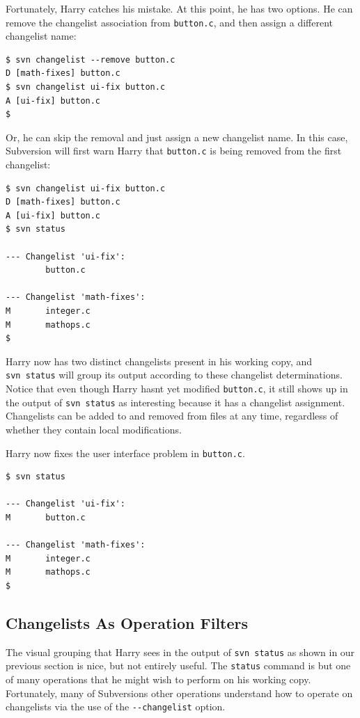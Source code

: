 Fortunately, Harry catches his mistake. At this point, he has two
options. He can remove the changelist association from
\texttt{button.c}, and then assign a different changelist name:

\begin{verbatim}
$ svn changelist --remove button.c
D [math-fixes] button.c
$ svn changelist ui-fix button.c
A [ui-fix] button.c
$
\end{verbatim}

Or, he can skip the removal and just assign a new changelist name. In
this case, Subversion will first warn Harry that \texttt{button.c} is
being removed from the first changelist:

\begin{verbatim}
$ svn changelist ui-fix button.c
D [math-fixes] button.c
A [ui-fix] button.c
$ svn status

--- Changelist 'ui-fix':
        button.c

--- Changelist 'math-fixes':
M       integer.c
M       mathops.c
$
\end{verbatim}

Harry now has two distinct changelists present in his working copy, and
\texttt{svn\ status} will group its output according to these changelist
determinations. Notice that even though Harry hasn\textquotesingle t yet
modified \texttt{button.c}, it still shows up in the output of
\texttt{svn\ status} as interesting because it has a changelist
assignment. Changelists can be added to and removed from files at any
time, regardless of whether they contain local modifications.

Harry now fixes the user interface problem in \texttt{button.c}.

\begin{verbatim}
$ svn status

--- Changelist 'ui-fix':
M       button.c

--- Changelist 'math-fixes':
M       integer.c
M       mathops.c
$
\end{verbatim}

\subsection{Changelists As Operation
Filters}\label{svn.advanced.changelists.asfilters}

The visual grouping that Harry sees in the output of
\texttt{svn\ status} as shown in our previous section is nice, but not
entirely useful. The \texttt{status} command is but one of many
operations that he might wish to perform on his working copy.
Fortunately, many of Subversion\textquotesingle s other operations
understand how to operate on changelists via the use of the
\texttt{-\/-changelist} option.

